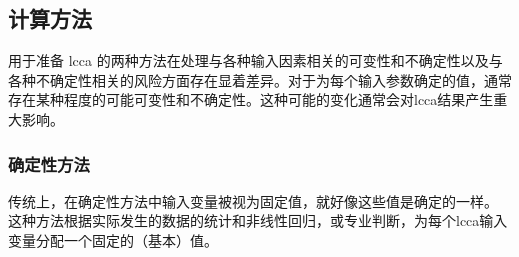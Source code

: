 \subsection{计算方法}
\label{subsec:computational-approaches}
用于准备 \acrlong*{lcca} 的两种方法在处理与各种输入因素相关的可变性和不确定性以及与各种不确定性相关的风险方面存在显着差异。对于为每个输入参数确定的值，通常存在某种程度的可能可变性和不确定性。这种可能的变化通常会对\acrlong*{lcca}结果产生重大影响。

\subsubsection{确定性方法}
传统上，在确定性方法中输入变量被视为固定值，就好像这些值是确定的一样。 这种方法根据实际发生的数据的统计和非线性回归，或专业判断，为每个\acrlong*{lcca}输入变量分配一个固定的（基本）值。

